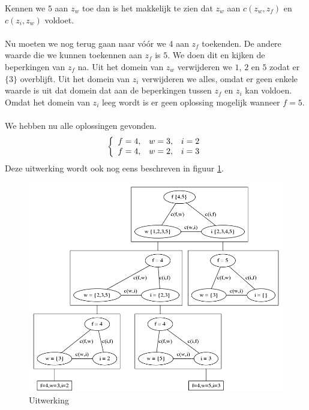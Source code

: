 \documentclass[alternative-exam.tex]{subfiles}
\begin{document}
Kennen we $5$ aan $z_w$ toe dan is het makkelijk te zien dat $z_w$ aan $c(z_w,z_f)$ en $c(z_i,z_w)$ voldoet.\\\\
Nu moeten we nog terug gaan naar v\'o\'or we $4$ aan $z_f$ toekenden. De andere waarde die we kunnen toekennen aan $z_f$ is $5$. We doen dit en kijken de beperkingen van $z_f$ na. Uit het domein van $z_w$ verwijderen we $1$, $2$ en $5$ zodat er $\{3\}$ overblijft. Uit het domein van $z_i$ verwijderen we alles, omdat er geen enkele waarde is uit dat domein dat aan de beperkingen tussen $z_f$ en $z_i$ kan voldoen. Omdat het domein van $z_i$ leeg wordt is er geen oplossing mogelijk wanneer $f=5$.\\\\
We hebben nu alle oplossingen gevonden.
\[
\left\lbrace
\begin{array}{c c c}
f=4,& w=3,& i=2\\
f=4,& w=2,& i=3\\
\end{array}
\right.
\] 
Deze uitwerking wordt ook nog eens beschreven in figuur \ref{uitwerking}.
\begin{figure}
[p]
\centering
\caption{Uitwerking}
\label{uitwerking}
\includegraphics[scale=0.4]{resources/graphs/uitwerking.png}
\end{figure}
\end{document}
